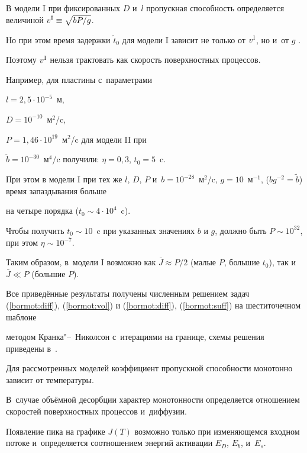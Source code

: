 \smallskip

 В модели I  при фиксированных $D$ и~$l $ пропускная способность определяется величиной $v^{\rm I}\equiv\sqrt{bP/g}$.

Но при этом время задержки $\tilde t_{0}$ для  модели I зависит не только от $v^{\rm I}$, но и~от $g$ \cite{bormatova:bib:Zaika2}.

Поэтому $v^{\rm I}$ нельзя трактовать как скорость поверхностных процессов.

Например, для пластины с~параметрами 

$l =2,5\cdot 10^{-5}$~м, 

$D=10^{-10}$~м$^{2}$/c, 

$P=1,46\cdot 10^{19}$~м$^{2}$/c для модели II при

$\tilde{b}=10^{-30}$~м$^{4}$/c получили: $\eta=0,3$, $t_{0}=5$~c.

При этом в модели I при тех же $l $, $D$, $P$ и~$b=10^{-28}$~м$^{2}$/c, $g=10$~м$^{-1}$, ($bg^{-2}=\tilde{b}$) время запаздывания больше

на четыре порядка ($t_{0}\sim4\cdot10^{4}$~c).

Чтобы получить $t_{0}\sim10$~c при указанных значениях $b$ и $g$, должно быть $P\sim10^{32}$, при этом $\eta\sim10^{-7}$.



Таким образом, в~модели I возможно как $\bar J\approx P/2$ (малые $P$, большие $t_{0}$), так и~$\bar J\ll P$ (большие $P$).



Все приведённые результаты получены численным решением задач (\ref{bormot:diff}), (\ref{bormot:vol}) и (\ref{bormot:diff}), (\ref{bormot:suff}) на шеститочечном шаблоне

методом Кранка"--~Николсон с~итерациями на границе, схемы решения приведены в~\cite{bormatova:bib:Zaika2, bormatova:bib:Zaika1}.



\smallskip



 Для рассмотренных моделей коэффициент пропускной способности монотонно зависит от температуры.

В~случае объёмной десорбции характер монотонности определяется отношением скоростей поверхностных процессов и~диффузии.

Появление пика на графике $J(T)$ возможно только при изменяющемся входном потоке и~определяется соотношением энергий активации $E_D$, $E_b$, и~$E_s$.







